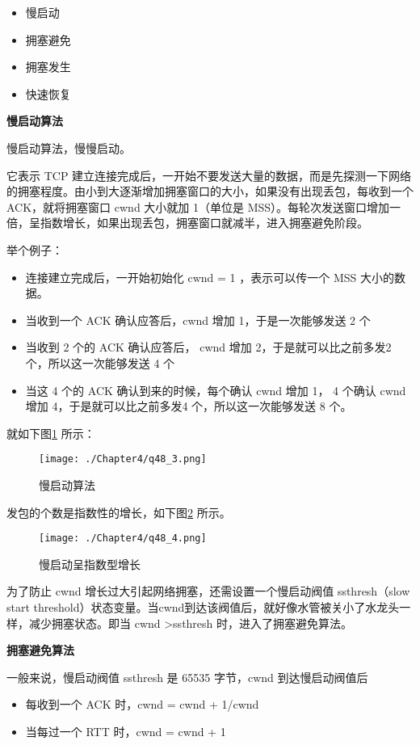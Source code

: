 \documentclass[cn,11pt,color=blue,lang=cn]{elegantbook}
\begin{document}
\begin{solution}
\begin{itemize}
	\item 慢启动
	\item 拥塞避免
	\item 拥塞发生
	\item 快速恢复
\end{itemize}

\begin{note} \textbf{慢启动算法} \end{note}
慢启动算法，慢慢启动。

它表示 TCP 建立连接完成后，一开始不要发送大量的数据，而是先探测一下网络的拥塞程度。由小到大逐渐增加拥塞窗口的大小，如果没有出现丢包，每收到一个 ACK，就将拥塞窗口 cwnd 大小就加 1（单位是 MSS）。每轮次发送窗口增加一倍，呈指数增长，如果出现丢包，拥塞窗口就减半，进入拥塞避免阶段。

举个例子：
\begin{itemize}
	\item 连接建立完成后，一开始初始化 cwnd = 1 ，表示可以传一个 MSS 大小的数据。
	\item 当收到一个 ACK 确认应答后，cwnd 增加 1，于是一次能够发送 2 个
	\item 当收到 2 个的 ACK 确认应答后， cwnd 增加 2，于是就可以比之前多发2 个，所以这一次能够发送 4 个
	\item 当这 4 个的 ACK 确认到来的时候，每个确认 cwnd 增加 1， 4 个确认 cwnd 增加 4，于是就可以比之前多发4 个，所以这一次能够发送 8 个。
\end{itemize}

就如下图\ref{fig48_3} 所示：
\begin{figure}[htbp]
\centering
\texttt{[image: ./Chapter4/q48\_3.png]}
\caption{慢启动算法}
\label{fig48_3}
\end{figure}

发包的个数是指数性的增长，如下图\ref{fig48_4} 所示。
\begin{figure}[htbp]
\centering
\texttt{[image: ./Chapter4/q48\_4.png]}
\caption{慢启动呈指数型增长}
\label{fig48_4}
\end{figure}

为了防止 cwnd 增长过大引起网络拥塞，还需设置一个慢启动阀值 ssthresh（slow start threshold）状态变量。当cwnd到达该阀值后，就好像水管被关小了水龙头一样，减少拥塞状态。即当 cwnd >ssthresh 时，进入了拥塞避免算法。

\begin{note} \textbf{拥塞避免算法} \end{note}
一般来说，慢启动阀值 ssthresh 是 65535 字节，cwnd 到达慢启动阀值后
\begin{itemize}
	\item 每收到一个 ACK 时，cwnd = cwnd + 1/cwnd
	\item 当每过一个 RTT 时，cwnd = cwnd + 1
\end{itemize}


\end{solution}
\end{document}
